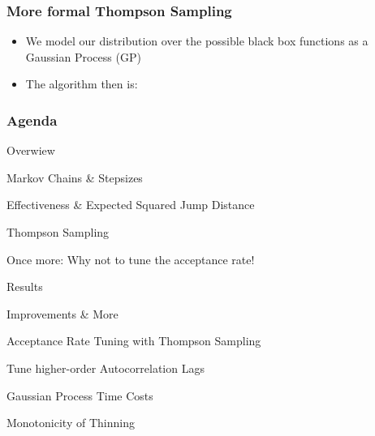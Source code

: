 \begin{frame}[c]
    \frametitle{More formal Thompson Sampling}
    \begin{itemize}
        \item We model our distribution over the possible black box functions as a Gaussian Process (GP)
        \item The algorithm then is:
            \begin{algorithm2e}[H]
            \end{algorithm2e}
    \end{itemize}
\end{frame}

\begin{frame}[c]
    \frametitle{Agenda}
    \begin{itemize}
        \item Overwiew
        \begin{itemize}
            {\color{lgray}
            \item Markov Chains \& Stepsizes
            \item Effectiveness \& Expected Squared Jump Distance 
            \item Thompson Sampling
            }
            \item Once more: Why not to tune the acceptance rate!
        \end{itemize}
        {\color{lgray}
        \item Results
        \item Improvements \& More
        }
        \begin{itemize}
            {\color{lgray}
            \item Acceptance Rate Tuning with Thompson Sampling
            \item Tune higher-order Autocorrelation Lags
            \item Gaussian Process Time Costs
            \item Monotonicity of Thinning
        }
        \end{itemize}
    \end{itemize}
\end{frame}

